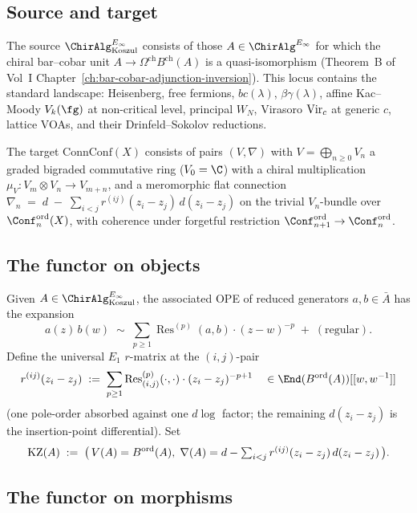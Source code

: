 \subsection{Source and target}

The source \(\ChirAlgInf_{\mathrm{Koszul}}\) consists of those
\(A \in \ChirAlgInf\) for which the chiral bar--cobar unit
\(A \to \Omega^{\mathrm{ch}} B^{\mathrm{ch}}(A)\) is a quasi-isomorphism
(Theorem~B of Vol~I Chapter~\ref{ch:bar-cobar-adjunction-inversion}).
This locus contains the standard landscape: Heisenberg, free fermions,
\(bc(\lambda)\), \(\beta\gamma(\lambda)\), affine Kac--Moody
\(V_{k}(\fg)\) at non-critical level, principal \(W_{N}\), Virasoro
\(\mathrm{Vir}_{c}\) at generic \(c\), lattice VOAs, and their Drinfeld--Sokolov
reductions.

The target \(\mathrm{ConnConf}(X)\) consists of pairs \((V, \nabla)\)
with \(V = \bigoplus_{n\geq 0} V_{n}\) a graded bigraded commutative
ring (\(V_{0} = \C\)) with a chiral multiplication
\(\mu_{V}\colon V_{m} \otimes V_{n} \to V_{m+n}\), and a meromorphic
flat connection
\(
  \nabla_{n} \;=\; d \;-\; \sum_{i<j} r^{(ij)}(z_{i}-z_{j})\, d(z_{i}-z_{j})
\)
on the trivial \(V_{n}\)-bundle over \(\Conf_{n}^{\mathrm{ord}}(X)\),
with coherence under forgetful restriction
\(\Conf_{n+1}^{\mathrm{ord}} \to \Conf_{n}^{\mathrm{ord}}\).

\subsection{The functor on objects}

Given \(A \in \ChirAlgInf_{\mathrm{Koszul}}\), the associated OPE of
reduced generators \(a, b \in \bar A\) has the expansion
\[
  a(z)\,b(w) \;\sim\; \sum_{p \geq 1}
  \operatorname{Res}^{(p)}(a,b) \cdot (z-w)^{-p} \;+\; (\text{regular}).
\]
Define the universal \(E_{1}\) \(r\)-matrix at the \((i,j)\)-pair
\[
  r^{(ij)}(z_{i} - z_{j})
  \;:=\; \sum_{p \geq 1} \operatorname{Res}^{(p)}_{(i,j)}(\cdot,\cdot) \cdot (z_{i} - z_{j})^{-p+1}
  \quad \in \End(\Bord(A))[[w, w^{-1}]]
\]
(one pole-order absorbed against one \(d\log\) factor; the remaining
\(d(z_{i}-z_{j})\) is the insertion-point differential). Set
\[
  \mathrm{KZ}(A) \;:=\;\bigl(\,V(A) = B^{\mathrm{ord}}(A),\; \nabla(A) = d - \textstyle\sum_{i<j} r^{(ij)}(z_{i}-z_{j})\, d(z_{i}-z_{j})\,\bigr).
\]

\subsection{The functor on morphisms}

